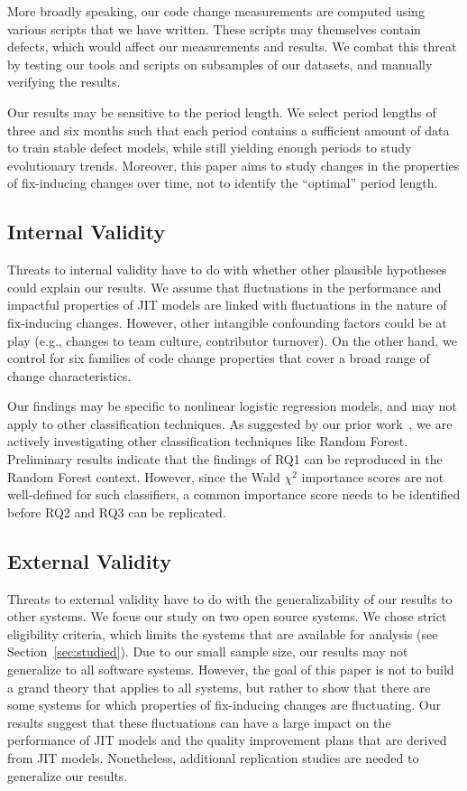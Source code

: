 More broadly speaking, our code change measurements are computed using various scripts that we have written.
These scripts may themselves contain defects, which would affect our measurements and results.
We combat this threat by testing our tools and scripts on subsamples of our datasets, and manually verifying the results.

Our results may be sensitive to the period length.
We select period lengths of three and six months such that each period contains a sufficient amount of data to train stable defect models, while still yielding enough periods to study evolutionary trends.
Moreover, this paper aims to study changes in the properties of fix-inducing changes over time, not to identify the ``optimal'' period length.

\subsection{Internal Validity}
\label{sec:ithreats}

Threats to internal validity have to do with whether other plausible hypotheses could explain our results.
We assume that fluctuations in the performance and impactful properties of JIT models are linked with fluctuations in the nature of fix-inducing changes.
However, other intangible confounding factors could be at play (e.g., changes to team culture, contributor turnover).
On the other hand, we control for six families of code change properties that cover a broad range of change characteristics.

Our findings may be specific to nonlinear logistic regression models, and may not apply to other classification techniques.
As suggested by our prior work~\cite{ghotra2015icse}, we are actively investigating other classification techniques like Random Forest.
Preliminary results indicate that the findings of RQ1 can be reproduced in the Random Forest context.
However, since the Wald $\chi^2$ importance scores are not well-defined for such classifiers, a common importance score needs to be identified before RQ2 and RQ3 can be replicated.

\subsection{External Validity}

Threats to external validity have to do with the generalizability of our results to other systems.
We focus our study on two open source systems.
We chose strict eligibility criteria, which limits the systems that are available for analysis (see Section~\ref{sec:studied}).
Due to our small sample size, our results may not generalize to all software systems.
However, the goal of this paper is not to build a grand theory that applies to all systems, but rather to show that there are some systems for which properties of fix-inducing changes are fluctuating.
Our results suggest that these fluctuations can have a large impact on the performance of JIT models and the quality improvement plans that are derived from JIT models.
Nonetheless, additional replication studies are needed to generalize our results.
